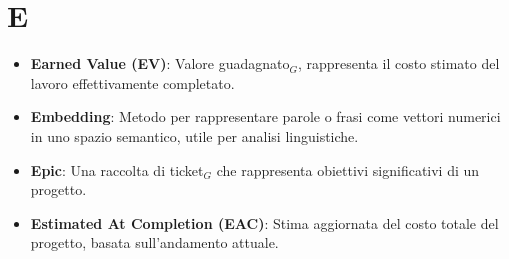 \section{E}
\begin{itemize}
    \item \textbf{Earned Value (EV)}: Valore guadagnato$_G$, rappresenta il costo stimato del lavoro effettivamente completato.
    \item \textbf{Embedding}: Metodo per rappresentare parole o frasi come vettori numerici in uno spazio semantico, utile per analisi linguistiche.
    \item \textbf{Epic}: Una raccolta di ticket$_G$ che rappresenta obiettivi significativi di un progetto.
    \item \textbf{Estimated At Completion (EAC)}: Stima aggiornata del costo totale del progetto, basata sull'andamento attuale.
\end{itemize}
